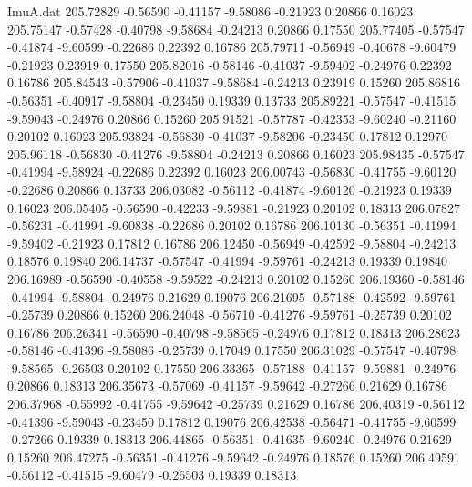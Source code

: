 \begin{filecontents}{ImuA.dat}
 205.72829   -0.56590   -0.41157   -9.58086   -0.21923    0.20866    0.16023
 205.75147   -0.57428   -0.40798   -9.58684   -0.24213    0.20866    0.17550
 205.77405   -0.57547   -0.41874   -9.60599   -0.22686    0.22392    0.16786
 205.79711   -0.56949   -0.40678   -9.60479   -0.21923    0.23919    0.17550
 205.82016   -0.58146   -0.41037   -9.59402   -0.24976    0.22392    0.16786
 205.84543   -0.57906   -0.41037   -9.58684   -0.24213    0.23919    0.15260
 205.86816   -0.56351   -0.40917   -9.58804   -0.23450    0.19339    0.13733
 205.89221   -0.57547   -0.41515   -9.59043   -0.24976    0.20866    0.15260
 205.91521   -0.57787   -0.42353   -9.60240   -0.21160    0.20102    0.16023
 205.93824   -0.56830   -0.41037   -9.58206   -0.23450    0.17812    0.12970
 205.96118   -0.56830   -0.41276   -9.58804   -0.24213    0.20866    0.16023
 205.98435   -0.57547   -0.41994   -9.58924   -0.22686    0.22392    0.16023
 206.00743   -0.56830   -0.41755   -9.60120   -0.22686    0.20866    0.13733
 206.03082   -0.56112   -0.41874   -9.60120   -0.21923    0.19339    0.16023
 206.05405   -0.56590   -0.42233   -9.59881   -0.21923    0.20102    0.18313
 206.07827   -0.56231   -0.41994   -9.60838   -0.22686    0.20102    0.16786
 206.10130   -0.56351   -0.41994   -9.59402   -0.21923    0.17812    0.16786
 206.12450   -0.56949   -0.42592   -9.58804   -0.24213    0.18576    0.19840
 206.14737   -0.57547   -0.41994   -9.59761   -0.24213    0.19339    0.19840
 206.16989   -0.56590   -0.40558   -9.59522   -0.24213    0.20102    0.15260
 206.19360   -0.58146   -0.41994   -9.58804   -0.24976    0.21629    0.19076
 206.21695   -0.57188   -0.42592   -9.59761   -0.25739    0.20866    0.15260
 206.24048   -0.56710   -0.41276   -9.59761   -0.25739    0.20102    0.16786
 206.26341   -0.56590   -0.40798   -9.58565   -0.24976    0.17812    0.18313
 206.28623   -0.58146   -0.41396   -9.58086   -0.25739    0.17049    0.17550
 206.31029   -0.57547   -0.40798   -9.58565   -0.26503    0.20102    0.17550
 206.33365   -0.57188   -0.41157   -9.59881   -0.24976    0.20866    0.18313
 206.35673   -0.57069   -0.41157   -9.59642   -0.27266    0.21629    0.16786
 206.37968   -0.55992   -0.41755   -9.59642   -0.25739    0.21629    0.16786
 206.40319   -0.56112   -0.41396   -9.59043   -0.23450    0.17812    0.19076
 206.42538   -0.56471   -0.41755   -9.60599   -0.27266    0.19339    0.18313
 206.44865   -0.56351   -0.41635   -9.60240   -0.24976    0.21629    0.15260
 206.47275   -0.56351   -0.41276   -9.59642   -0.24976    0.18576    0.15260
 206.49591   -0.56112   -0.41515   -9.60479   -0.26503    0.19339    0.18313

\end{filecontents}
